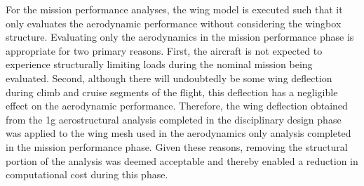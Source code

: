 For the mission performance analyses, the wing model is executed such that it only evaluates the aerodynamic performance without considering the wingbox structure.
Evaluating only the aerodynamics in the mission performance phase is appropriate for two primary reasons. 
First, the aircraft is not expected to experience structurally limiting loads during the nominal mission being evaluated.
Second, although there will undoubtedly be some wing deflection during climb and cruise segments of the flight, this deflection has a negligible effect on the aerodynamic performance. 
Therefore, the wing deflection obtained from the 1g aerostructural analysis completed in the disciplinary design phase was applied to the wing mesh used in the aerodynamics only analysis completed in the mission performance phase.
Given these reasons, removing the structural portion of the analysis was deemed acceptable and thereby enabled a reduction in computational cost during this phase.
